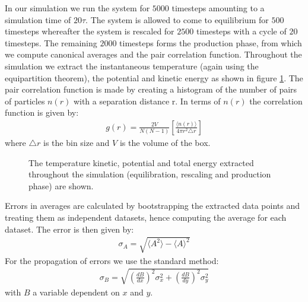 \documentclass[11pt]{article}
\begin{document}
In our simulation we run the system for $5000$ timesteps amounting to a simulation time of $20\tau$. The system is allowed to come to equilibrium for $500$ timesteps whereafter the system is rescaled for $2500$ timesteps with a cycle of $20$ timesteps. The remaining $2000$ timesteps forms the production phase, from which we compute canonical averages and the pair correlation function. Throughout the simulation we extract the instantaneous temperature (again using the equipartition theorem), the potential and kinetic energy as shown in figure \ref{methods}. The pair correlation function is made by creating a histogram of the number of pairs of particles $n(r)$ with a separation distance r. In terms of $n(r)$ the correlation function is given by:
\begin{align*}
g(r)=\frac{2V}{N(N-1)}\left[\frac{\langle n(r)\rangle}{4\pi r^2\triangle r}\right]
\end{align*}
where $\triangle r$ is the bin size and $V$ is the volume of the box.



\begin{figure}
\hfill
{}
\hfill
{}
\hfill
\caption{The temperature kinetic, potential and total energy extracted throughout the simulation (equilibration, rescaling and production phase) are shown.}\label{methods}
\end{figure}


Errors in averages are calculated by bootstrapping the extracted data points and treating them as independent datasets, hence computing the average for each dataset. The error is then given by:
\begin{align*}
\sigma_A=\sqrt{\langle A^2\rangle-\langle A\rangle^2}
\end{align*}
For the propagation of errors we use the standard method:
\begin{align*}
\sigma_B=\sqrt{\left(\frac{dB}{dx}\right)^2\sigma_x^2+\left(\frac{dB}{dy}\right)^2\sigma_y^2}
\end{align*}
with $B$ a variable dependent on $x$ and $y$. 
\end{document}

